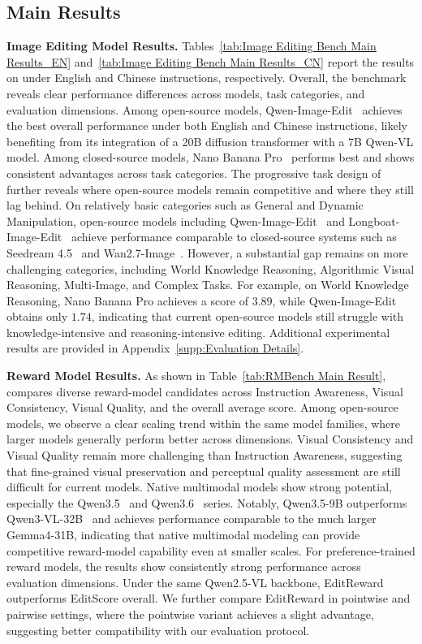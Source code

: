 \subsection{Main Results}
\textbf{Image Editing Model Results.}
Tables~\ref{tab:Image Editing Bench Main Results_EN} and~\ref{tab:Image Editing Bench Main Results_CN} report the results on {\bench} under English and Chinese instructions, respectively. Overall, the benchmark reveals clear performance differences across models, task categories, and evaluation dimensions.
Among open-source models, Qwen-Image-Edit~\cite{wu2025qwen} achieves the best overall performance under both English and Chinese instructions, likely benefiting from its integration of a 20B diffusion transformer with a 7B Qwen-VL model. Among closed-source models, Nano Banana Pro~\cite{nanobananapro} performs best and shows consistent advantages across task categories.
The progressive task design of {\bench} further reveals where open-source models remain competitive and where they still lag behind. On relatively basic categories such as General and Dynamic Manipulation, open-source models including Qwen-Image-Edit~\cite{wu2025qwen} and Longboat-Image-Edit~\cite{team2025longcat} achieve performance comparable to closed-source systems such as Seedream 4.5~\cite{seedream2025seedream} and Wan2.7-Image~\cite{wan}. However, a substantial gap remains on more challenging categories, including World Knowledge Reasoning, Algorithmic Visual Reasoning, Multi-Image, and Complex Tasks. For example, on World Knowledge Reasoning, Nano Banana Pro achieves a score of $3.89$, while Qwen-Image-Edit obtains only $1.74$, indicating that current open-source models still struggle with knowledge-intensive and reasoning-intensive editing.
Additional experimental results are provided in Appendix~\ref{supp:Evaluation Details}.


\textbf{Reward Model Results.}
As shown in Table~\ref{tab:RMBench Main Result}, {\rmbench} compares diverse reward-model candidates across Instruction Awareness, Visual Consistency, Visual Quality, and the overall average score. Among open-source models, we observe a clear scaling trend within the same model families, where larger models generally perform better across dimensions. Visual Consistency and Visual Quality remain more challenging than Instruction Awareness, suggesting that fine-grained visual preservation and perceptual quality assessment are still difficult for current models.
Native multimodal models show strong potential, especially the Qwen3.5~\cite{qwen3.5} and Qwen3.6~\cite{qwen3.6-27b,qwen36_35b_a3b} series. Notably, Qwen3.5-9B outperforms Qwen3-VL-32B~\cite{bai2025qwen3} and achieves performance comparable to the much larger Gemma4-31B, indicating that native multimodal modeling can provide competitive reward-model capability even at smaller scales.
For preference-trained reward models, the results show consistently strong performance across evaluation dimensions. Under the same Qwen2.5-VL backbone, EditReward outperforms EditScore overall. We further compare EditReward in pointwise and pairwise settings, where the pointwise variant achieves a slight advantage, suggesting better compatibility with our evaluation protocol.




